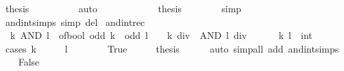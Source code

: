 \begin{isabellebody}
\ {\isacharquery}{\kern0pt}thesis\isanewline
\ \ \ \ \ \ \ \ \isamarkupfalse%
\ auto\isanewline
\ \ \ \ \isamarkupfalse%
\isanewline
\ \ \ \ \isamarkupfalse%
\ \isamarkupfalse%
\ {\isacharquery}{\kern0pt}thesis\isanewline
\ \ \ \ \ \ \isamarkupfalse%
\ simp\isanewline
\ \ \isamarkupfalse%
\isanewline
{}\isamarkupfalse%
%
\endisatagproof
{\isafoldproof}%
%
\isadelimproof
%
\endisadelimproof
\isanewline
\isanewline
{}\isamarkupfalse%
\ and{\isacharunderscore}{\kern0pt}int{\isachardot}{\kern0pt}simps\ {\isacharbrackleft}{\kern0pt}simp\ del{\isacharbrackright}{\kern0pt}\isanewline
\isanewline
{}\isamarkupfalse%
\ and{\isacharunderscore}{\kern0pt}int{\isacharunderscore}{\kern0pt}rec{\isacharcolon}{\kern0pt}\isanewline
\ \ {\isacartoucheopen}k\ AND\ l\ {\isacharequal}{\kern0pt}\ of{\isacharunderscore}{\kern0pt}bool\ {\isacharparenleft}{\kern0pt}odd\ k\ {\isasymand}\ odd\ l{\isacharparenright}{\kern0pt}\ {\isacharplus}{\kern0pt}\ {}\ {\isacharasterisk}{\kern0pt}\ {\isacharparenleft}{\kern0pt}{\isacharparenleft}{\kern0pt}k\ div\ {}{\isacharparenright}{\kern0pt}\ AND\ {\isacharparenleft}{\kern0pt}l\ div\ {}{\isacharparenright}{\kern0pt}{\isacharparenright}{\kern0pt}{\isacartoucheclose}\isanewline
\ \ \ \ \ k\ l\ {\isacharcolon}{\kern0pt}{\isacharcolon}{\kern0pt}\ int\isanewline
%
\isadelimproof
%
\endisadelimproof
%
\isatagproof
{}\isamarkupfalse%
\ {\isacharparenleft}{\kern0pt}cases\ {\isacartoucheopen}k\ {\isasymin}\ {\isacharbraceleft}{\kern0pt}{}{\isacharcomma}{\kern0pt}\ {\isacharminus}{\kern0pt}\ {}{\isacharbraceright}{\kern0pt}\ {\isasymand}\ l\ {\isasymin}\ {\isacharbraceleft}{\kern0pt}{}{\isacharcomma}{\kern0pt}\ {\isacharminus}{\kern0pt}\ {}{\isacharbraceright}{\kern0pt}{\isacartoucheclose}{\isacharparenright}{\kern0pt}\isanewline
\ \ \isamarkupfalse%
\ True\isanewline
\ \ \isamarkupfalse%
\ \isamarkupfalse%
\ {\isacharquery}{\kern0pt}thesis\isanewline
\ \ \ \ \isamarkupfalse%
\ auto\ {\isacharparenleft}{\kern0pt}simp{\isacharunderscore}{\kern0pt}all\ add{\isacharcolon}{\kern0pt}\ and{\isacharunderscore}{\kern0pt}int{\isachardot}{\kern0pt}simps{\isacharparenright}{\kern0pt}\isanewline
{}\isamarkupfalse%
\isanewline
\ \ \isamarkupfalse%
\ False\isanewline
\ \ \isamarkupfalse%
\ \isamarkupfalse%

\end{isabellebody}
